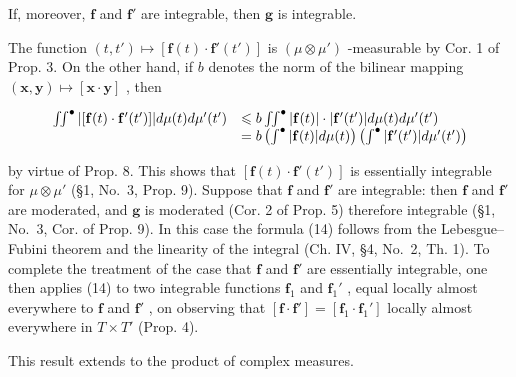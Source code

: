 If, moreover, \(\mathbf{f}\) and \(\mathbf{f}'\) are integrable, then \(\mathbf{g}\) is integrable.

The function \((t, t') \mapsto [\mathbf{f}(t) \cdot \mathbf{f}'(t')]\) is \((\mu \otimes \mu')\) -measurable by Cor. 1 of Prop. 3. On the other hand, if \(b\) denotes the norm of the bilinear mapping \((\mathbf{x}, \mathbf{y}) \mapsto [\mathbf{x} \cdot \mathbf{y}]\) , then

\[
\begin{array}{r l} \iint^ {\bullet} | [ \mathbf {f} (t) \cdot \mathbf {f} ^ {\prime} (t ^ {\prime}) ] | d \mu (t) d \mu^ {\prime} (t ^ {\prime}) & \leqslant b \iint^ {\bullet} | \mathbf {f} (t) | \cdot | \mathbf {f} ^ {\prime} (t ^ {\prime}) | d \mu (t) d \mu^ {\prime} (t ^ {\prime}) \\ & = b \left(\int^ {\bullet} | \mathbf {f} (t) | d \mu (t)\right) \left(\int^ {\bullet} | \mathbf {f} ^ {\prime} (t ^ {\prime}) | d \mu^ {\prime} (t ^ {\prime})\right) \end{array}
\]

by virtue of Prop. 8. This shows that \([\mathbf{f}(t) \cdot \mathbf{f}'(t')]\) is essentially integrable for \(\mu \otimes \mu'\) (§1, No.~3, Prop. 9). Suppose that \(\mathbf{f}\) and \(\mathbf{f}'\) are integrable: then \(\mathbf{f}\) and \(\mathbf{f}'\) are moderated, and \(\mathbf{g}\) is moderated (Cor. 2 of Prop. 5) therefore integrable (§1, No.~3, Cor. of Prop. 9). In this case the formula (14) follows from the Lebesgue--Fubini theorem and the linearity of the integral (Ch. IV, §4, No.~2, Th. 1). To complete the treatment of the case that \(\mathbf{f}\) and \(\mathbf{f}'\) are essentially integrable, one then applies (14) to two integrable functions \(\mathbf{f}_1\) and \(\mathbf{f}_1'\) , equal locally almost everywhere to \(\mathbf{f}\) and \(\mathbf{f}'\) , on observing that \([\mathbf{f} \cdot \mathbf{f}'] = [\mathbf{f}_1 \cdot \mathbf{f}_1']\) locally almost everywhere in \(T \times T'\) (Prop. 4).

This result extends to the product of complex measures.

